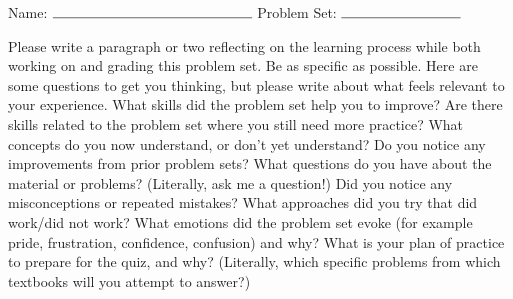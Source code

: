 \documentclass[11pt]{article}
\begin{document}

\hfill Name: $\rule{5cm}{.15mm}$\newline
{}\hfill Problem Set: $\rule{3cm}{.15mm}$




\vspace{1cm}
\Large{
Please write a paragraph or two reflecting on the learning process while both working on and grading this problem set. Be as specific as possible. Here are some questions to get you thinking, but please write about what feels relevant to your experience. What skills did the problem set help you to improve? Are there skills related to the problem set where you still need more practice? What concepts do you now understand, or don't yet understand? Do you notice any improvements from prior problem sets? What questions do you have about the material or problems? (Literally, ask me a question!) Did you notice any misconceptions or repeated mistakes? What approaches did you try that did work/did not work? What emotions did the problem set evoke (for example pride, frustration, confidence, confusion) and why? What is your plan of practice to prepare for the quiz, and why? (Literally, which specific problems from which textbooks will you attempt to answer?)}
\end{document}
